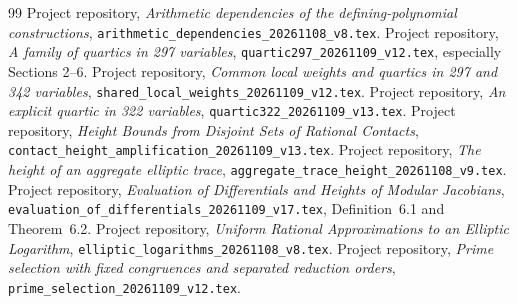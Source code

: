 \documentclass[11pt,a4paper]{article}
\begin{document}
\begin{thebibliography}{99}\small\setlength{\itemsep}{2pt}
 Project repository,
\emph{Arithmetic dependencies of the defining-polynomial constructions},
\nolinkurl{arithmetic_dependencies_20261108_v8.tex}.
 Project repository,
\emph{A family of quartics in 297 variables},
\nolinkurl{quartic297_20261109_v12.tex}, especially Sections 2--6.
 Project repository,
\emph{Common local weights and quartics in 297 and 342 variables},
\nolinkurl{shared_local_weights_20261109_v12.tex}.
 Project repository,
\emph{An explicit quartic in 322 variables},
\nolinkurl{quartic322_20261109_v13.tex}.
 Project repository,
\emph{Height Bounds from Disjoint Sets of Rational Contacts},
\nolinkurl{contact_height_amplification_20261109_v13.tex}.
 Project repository,
\emph{The height of an aggregate elliptic trace},
\nolinkurl{aggregate_trace_height_20261108_v9.tex}.
 Project repository,
\emph{Evaluation of Differentials and Heights of Modular Jacobians},
\nolinkurl{evaluation_of_differentials_20261109_v17.tex},
Definition~6.1 and Theorem~6.2.
 Project repository,
\emph{Uniform Rational Approximations to an Elliptic Logarithm},
\nolinkurl{elliptic_logarithms_20261108_v8.tex}.
 Project repository,
\emph{Prime selection with fixed congruences and separated reduction orders},
\nolinkurl{prime_selection_20261109_v12.tex}.
\end{thebibliography}
\end{document}
